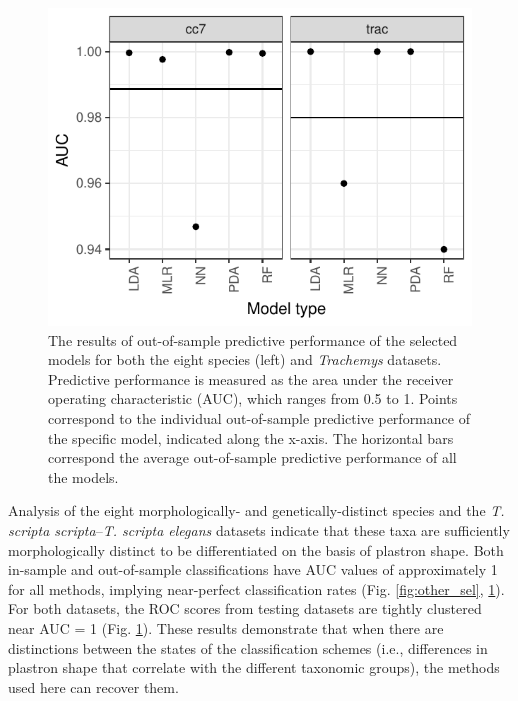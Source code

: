 \documentclass[10pt,letterpaper]{article}
\begin{document}
\begin{figure}[h]
  \centering
  \includegraphics[height = 0.3\textheight, width = \textwidth, keepaspectratio = true]{figure/other_oos_sel}
  \caption{The results of out-of-sample predictive performance of the selected models for both the eight species (left) and \textit{Trachemys} datasets. Predictive performance is measured as the area under the receiver operating characteristic (AUC), which ranges from 0.5 to 1. Points correspond to the individual out-of-sample predictive performance of the specific model, indicated along the x-axis. The horizontal bars correspond the average out-of-sample predictive performance of all the models.}
  \label{fig:other_oos}
\end{figure}

Analysis of the eight morphologically- and genetically-distinct species and the \textit{T. scripta scripta}--\textit{T. scripta elegans} datasets indicate that these taxa are sufficiently morphologically distinct to be differentiated on the basis of plastron shape. Both in-sample and out-of-sample classifications have AUC values of approximately 1 for all methods, implying near-perfect classification rates (Fig. \ref{fig:other_sel}, \ref{fig:other_oos}). For both datasets, the ROC scores from testing datasets are tightly clustered near AUC = 1 (Fig. \ref{fig:other_oos}). These results demonstrate that when there are distinctions between the states of the classification schemes (i.e., differences in plastron shape that correlate with the different taxonomic groups), the methods used here can recover them.
\end{document}
